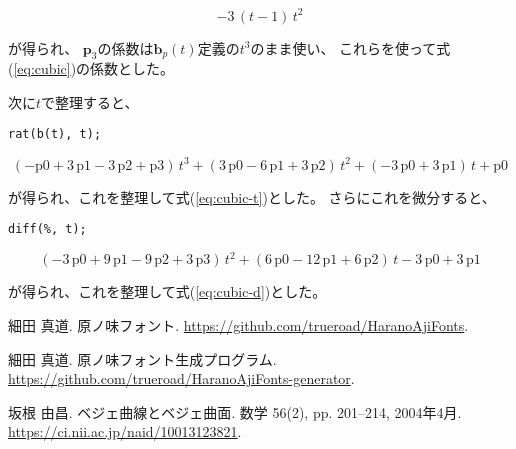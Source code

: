 \documentclass[dvipdfmx]{jsarticle}
\newcommand\VectBold[1]{\boldsymbol{#1}}
\newcommand\VectBold[1]{\symbf{#1}}
\newcommand\Vect[1]{\VectBold{#1}}
\begin{document}
\[
-3\,\left(t-1\right)\,t^2
\]

が得られ、
$\Vect{p}_3$の係数は$\Vect{b}_p\left(t\right)$定義の$t^3$のまま使い、
これらを使って式(\ref{eq:cubic})の係数とした。

次に$t$で整理すると、

\begin{lstlisting}
rat(b(t), t);
\end{lstlisting}

\[
\left(-\mathrm{p0}+3\,\mathrm{p1}-3\,\mathrm{p2}+\mathrm{p3}\right)\,t^3
+\left(3\,\mathrm{p0}-6\,\mathrm{p1}+3\,\mathrm{p2}\right)\,t^2
+\left(-3\,\mathrm{p0}+3\,\mathrm{p1}\right)\,t+\mathrm{p0}
\]

が得られ、これを整理して式(\ref{eq:cubic-t})とした。
さらにこれを微分すると、

\begin{lstlisting}
diff(%, t);
\end{lstlisting}

\[
\left(-3\,\mathrm{p0}+9\,\mathrm{p1}-9\,\mathrm{p2}+3\,\mathrm{p3}\right)\,t^2
+\left(6\,\mathrm{p0}-12\,\mathrm{p1}+6\,\mathrm{p2}\right)\,t
-3\,\mathrm{p0}+3\,\mathrm{p1}
\]

が得られ、これを整理して式(\ref{eq:cubic-d})とした。

\begin{thebibliography}{9}

  細田 真道. 原ノ味フォント.
  \url{https://github.com/trueroad/HaranoAjiFonts}.

  細田 真道. 原ノ味フォント生成プログラム.
  \url{https://github.com/trueroad/HaranoAjiFonts-generator}.

  坂根 由昌. ベジェ曲線とベジェ曲面.
  数学 56(2), pp. 201--214, 2004年4月.
  \url{https://ci.nii.ac.jp/naid/10013123821}.

\end{thebibliography}
\end{document}
